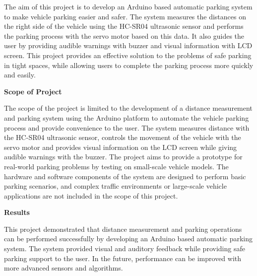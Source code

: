 \begin{minipage}{\linewidth}
    
    The aim of this project is to develop an Arduino based automatic parking system to make vehicle parking easier and safer. The system measures the distances on the right side of the vehicle using the HC-SR04 ultrasonic sensor and performs the parking process with the servo motor based on this data. It also guides the user by providing audible warnings with buzzer and visual information with LCD screen. This project provides an effective solution to the problems of safe parking in tight spaces, while allowing users to complete the parking process more quickly and easily.


\end{minipage}
\vspace{1cm}
\begin{center}
\textbf{Scope of Project}
\end{center}

 \begin{minipage}{\linewidth}
    
   The scope of the project is limited to the development of a distance measurement and parking system using the Arduino platform to automate the vehicle parking process and provide convenience to the user. The system measures distance with the HC-SR04 ultrasonic sensor, controls the movement of the vehicle with the servo motor and provides visual information on the LCD screen while giving audible warnings with the buzzer. The project aims to provide a prototype for real-world parking problems by testing on small-scale vehicle models. The hardware and software components of the system are designed to perform basic parking scenarios, and complex traffic environments or large-scale vehicle applications are not included in the scope of this project.

\end{minipage}
\vspace{1cm}
\begin{center}
\textbf{Results}
\end{center}

\begin{minipage}{\linewidth}
    
    This project demonstrated that distance measurement and parking operations can be performed successfully by developing an Arduino based automatic parking system. The system provided visual and auditory feedback while providing safe parking support to the user. In the future, performance can be improved with more advanced sensors and algorithms.
\end{minipage}